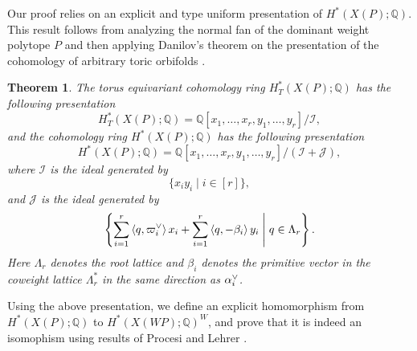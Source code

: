 \documentclass{amsart}
\newtheorem{theorem}{Theorem}[section]
\theoremstyle{definition}
\theoremstyle{remark}
\numberwithin{equation}{section}
\begin{document}
Our proof relies on an explicit and type uniform presentation of $H^*\left(X(P) ; \mathbb{Q}\right)$. This result follows from analyzing the normal fan of the dominant weight polytope $P$
and then applying Danilov's theorem on the presentation of the cohomology of arbitrary toric orbifolds \cite{danilov1978geometry}. 

\begin{theorem} \label{thm-pres-P}
    The torus equivariant cohomology ring $H^*_T(X(P) ; \mathbb{Q})$ has the following presentation 
    \begin{equation} 
      H^*_T\left(X(P) ; \mathbb{Q}\right)=\mathbb{Q}\left[x_1, \ldots, x_r, y_1, \ldots, y_r\right] /\mathcal{I},
    \end{equation}
    and the cohomology ring $H^*\left(X(P) ; \mathbb{Q}\right)$ has the following presentation
    \begin{equation} \label{eq-pres-P}
      H^*\left(X(P) ; \mathbb{Q}\right)=\mathbb{Q}\left[x_1, \ldots, x_r, y_1, \ldots, y_r\right] /\left(\mathcal{I}+\mathcal{J}\right),
    \end{equation}
    where $\mathcal{I}$ is the ideal generated by
    \[\{x_i y_i \mid i \in [r]\},\]
    and $\mathcal{J}$ is the ideal generated by 
    \[\left\{\sum_{i=1}^r\left\langle q, \varpi_i\spcheck \right\rangle x_i+\sum_{i=1}^r\left\langle q, -\beta_i \right\rangle y_i \Biggm\vert q \in \Lambda_r\right\}.\]
    Here $\Lambda_r$ denotes the root lattice and $\beta_i$ denotes the primitive vector in the coweight lattice $\Lambda_r^*$ in the same direction as $\alpha_i\spcheck$.
\end{theorem}

Using the above presentation, we define an explicit homomorphism from $H^*(X(P) ; \mathbb{Q})$ to $H^*(X(\mathit{WP}) ; \mathbb{Q})^W$, and prove that it is indeed an isomophism using results of Procesi \cite{Procesi90} and Lehrer \cite{lehrer2008rational}.
\end{document}
